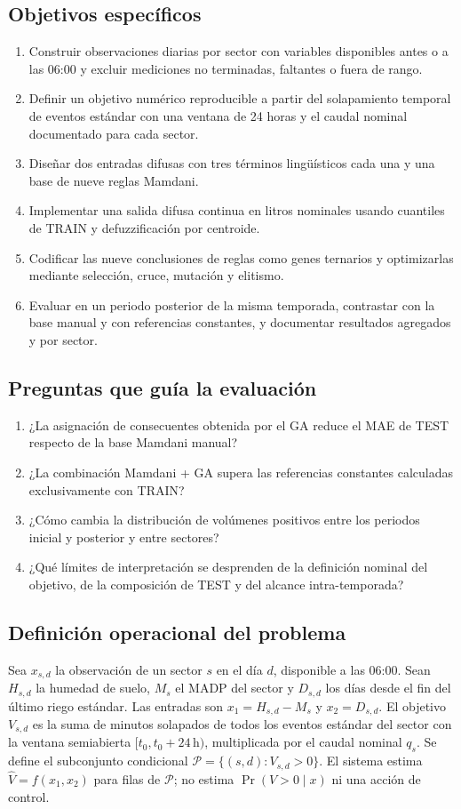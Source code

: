 \documentclass[11pt,letterpaper]{article}
\begin{document}
\subsection{Objetivos específicos}
\begin{enumerate}
  \item Construir observaciones diarias por sector con variables disponibles antes o a las 06:00 y excluir mediciones no terminadas, faltantes o fuera de rango.
  \item Definir un objetivo numérico reproducible a partir del solapamiento temporal de eventos estándar con una ventana de 24 horas y el caudal nominal documentado para cada sector.
  \item Diseñar dos entradas difusas con tres términos lingüísticos cada una y una base de nueve reglas Mamdani.
  \item Implementar una salida difusa continua en litros nominales usando cuantiles de TRAIN y defuzzificación por centroide.
  \item Codificar las nueve conclusiones de reglas como genes ternarios y optimizarlas mediante selección, cruce, mutación y elitismo.
  \item Evaluar en un periodo posterior de la misma temporada, contrastar con la base manual y con referencias constantes, y documentar resultados agregados y por sector.
\end{enumerate}

\subsection{Preguntas que guía la evaluación}
\begin{enumerate}
  \item ¿La asignación de consecuentes obtenida por el GA reduce el MAE de TEST respecto de la base Mamdani manual?
  \item ¿La combinación Mamdani + GA supera las referencias constantes calculadas exclusivamente con TRAIN?
  \item ¿Cómo cambia la distribución de volúmenes positivos entre los periodos inicial y posterior y entre sectores?
  \item ¿Qué límites de interpretación se desprenden de la definición nominal del objetivo, de la composición de TEST y del alcance intra-temporada?
\end{enumerate}

\subsection{Definición operacional del problema}
Sea $x_{s,d}$ la observación de un sector $s$ en el día $d$, disponible a las 06:00. Sean $H_{s,d}$ la humedad de suelo, $M_s$ el MADP del sector y $D_{s,d}$ los días desde el fin del último riego estándar. Las entradas son $x_1=H_{s,d}-M_s$ y $x_2=D_{s,d}$. El objetivo $V_{s,d}$ es la suma de minutos solapados de todos los eventos estándar del sector con la ventana semiabierta $[t_0,t_0+24\,\mathrm{h})$, multiplicada por el caudal nominal $q_s$. Se define el subconjunto condicional $\mathcal{P}=\{(s,d): V_{s,d}>0\}$. El sistema estima $\widehat V=f(x_1,x_2)$ para filas de $\mathcal{P}$; no estima $\Pr(V>0\mid x)$ ni una acción de control.
\end{document}
